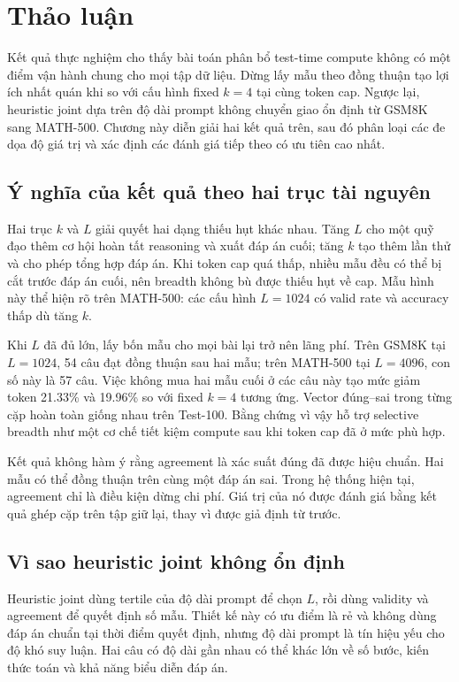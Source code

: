 \chapter{Thảo luận}
\label{chap:discussion}

Kết quả thực nghiệm cho thấy bài toán phân bổ test-time compute không có một
điểm vận hành chung cho mọi tập dữ liệu. Dừng lấy mẫu theo đồng thuận tạo lợi
ích nhất quán khi so với cấu hình fixed $k=4$ tại cùng token cap. Ngược lại,
heuristic joint dựa trên độ dài prompt không chuyển giao ổn định từ GSM8K sang
MATH-500. Chương này diễn giải hai kết quả trên, sau đó phân loại các đe dọa độ
giá trị và xác định các đánh giá tiếp theo có ưu tiên cao nhất.

\section{Ý nghĩa của kết quả theo hai trục tài nguyên}

Hai trục $k$ và $L$ giải quyết hai dạng thiếu hụt khác nhau. Tăng $L$ cho một
quỹ đạo thêm cơ hội hoàn tất reasoning và xuất đáp án cuối; tăng $k$ tạo thêm
lần thử và cho phép tổng hợp đáp án. Khi token cap quá thấp, nhiều mẫu đều có
thể bị cắt trước đáp án cuối, nên breadth không bù được thiếu hụt về cap. Mẫu
hình này thể hiện rõ trên MATH-500: các cấu hình $L=1024$ có valid rate và
accuracy thấp dù tăng $k$.

Khi $L$ đã đủ lớn, lấy bốn mẫu cho mọi bài lại trở nên lãng phí. Trên GSM8K tại
$L=1024$, 54 câu đạt đồng thuận sau hai mẫu; trên MATH-500 tại $L=4096$, con số
này là 57 câu. Việc không mua hai mẫu cuối ở các câu này tạo mức giảm token
21.33\% và 19.96\% so với fixed $k=4$ tương ứng. Vector đúng--sai trong từng
cặp hoàn toàn giống nhau trên Test-100. Bằng chứng vì vậy hỗ trợ selective
breadth như một cơ chế tiết kiệm compute sau khi token cap đã ở mức phù hợp.

Kết quả không hàm ý rằng agreement là xác suất đúng đã được hiệu chuẩn. Hai
mẫu có thể đồng thuận trên cùng một đáp án sai. Trong hệ thống hiện tại,
agreement chỉ là điều kiện dừng chi phí. Giá trị của nó được đánh giá bằng kết
quả ghép cặp trên tập giữ lại, thay vì được giả định từ trước.

\section{Vì sao heuristic joint không ổn định}

Heuristic joint dùng tertile của độ dài prompt để chọn $L$, rồi dùng validity
và agreement để quyết định số mẫu. Thiết kế này có ưu điểm là rẻ và không dùng
đáp án chuẩn tại thời điểm quyết định, nhưng độ dài prompt là tín hiệu yếu cho
độ khó suy luận. Hai câu có độ dài gần nhau có thể khác lớn về số bước, kiến
thức toán và khả năng biểu diễn đáp án.

